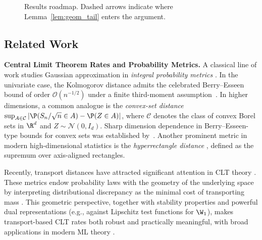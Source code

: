 \documentclass[mnsc,nonblindrev]{informs3}
\begin{document}
\begin{figure}[htbp]
\caption{Results roadmap. Dashed arrows indicate where Lemma~\ref{lem:geom_tail} enters the argument.}
\label{fig:roadmap}
\end{figure}
\subsection{Related Work}
\noindent\textbf{Central Limit Theorem Rates and Probability Metrics.} 
A classical line of work studies Gaussian approximation in \emph{integral probability metrics} \citep{muller1997integral}. In the univariate
case, the Kolmogorov distance admits the celebrated Berry--Esseen bound of order
$\mathcal O(n^{-1/2})$ under a finite third-moment assumption~\citep{petrov2012sums}. In higher dimensions, a common analogue is the
\emph{convex-set distance} $\sup_{A\in\mathcal C}|\P(S_n/\sqrt n\in A)-\P(Z\in A)|$, where $\mathcal{C}$
denotes the class of convex Borel sets in $\R^d$ and
$Z\sim\mathcal N(0,I_d)$. Sharp dimension dependence in Berry--Esseen-type bounds
for convex sets was established by~\cite{bentkus2003dependence}. Another prominent
metric in modern high-dimensional statistics is the \emph{hyperrectangle
distance} \citep{chen2018gaussian,chen2019randomized}, defined as the supremum
over axis-aligned rectangles.

Recently, transport distances have attracted significant attention in CLT theory
\citep{rio2009upper,gallouet2018regularity,raivc2018multivariate,bonis2020stein,srikant2024rates}.
These metrics endow probability laws with the geometry of the underlying space by
interpreting distributional discrepancy as the minimal cost of transporting mass
\citep{villani2008optimal}. This geometric perspective, together with stability
properties \citep{kuhn2019wasserstein} and powerful dual
representations (e.g., against Lipschitz test functions for $\W_1$), makes
transport-based CLT rates both robust and practically meaningful, with broad
applications in modern ML theory \citep{panaretos2019statistical,huo2024collusion}.
\end{document}
